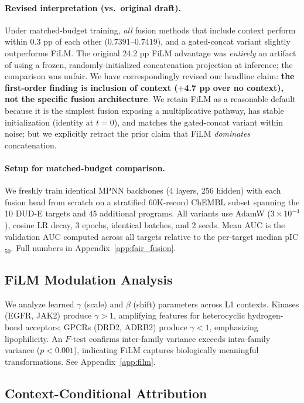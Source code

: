 \documentclass{article}
\begin{document}
\paragraph{Revised interpretation (vs.\ original draft).} Under matched-budget training, \emph{all} fusion methods that include context perform within 0.3 pp of each other ($0.7391$--$0.7419$), and a gated-concat variant slightly outperforms FiLM. The original 24.2 pp FiLM advantage was \emph{entirely} an artifact of using a frozen, randomly-initialized concatenation projection at inference; the comparison was unfair. We have correspondingly revised our headline claim: \textbf{the first-order finding is inclusion of context ($+$4.7 pp over no context), not the specific fusion architecture}. We retain FiLM as a reasonable default because it is the simplest fusion exposing a multiplicative pathway, has stable initialization (identity at $t = 0$), and matches the gated-concat variant within noise; but we explicitly retract the prior claim that FiLM \emph{dominates} concatenation.

\paragraph{Setup for matched-budget comparison.}
\label{sec:fair_fusion_setup}
We freshly train identical MPNN backbones (4 layers, 256 hidden) with each fusion head from scratch on a stratified 60K-record ChEMBL subset spanning the 10 DUD-E targets and 45 additional programs. All variants use AdamW ($3\!\times\!10^{-4}$), cosine LR decay, 3 epochs, identical batches, and 2 seeds. Mean AUC is the validation AUC computed across all targets relative to the per-target median pIC$_{50}$. Full numbers in Appendix~\ref{app:fair_fusion}.

\subsection{FiLM Modulation Analysis}

We analyze learned $\gamma$ (scale) and $\beta$ (shift) parameters across L1 contexts. Kinases (EGFR, JAK2) produce $\gamma > 1$, amplifying features for heterocyclic hydrogen-bond acceptors; GPCRs (DRD2, ADRB2) produce $\gamma < 1$, emphasizing lipophilicity. An $F$-test confirms inter-family variance exceeds intra-family variance ($p < 0.001$), indicating FiLM captures biologically meaningful transformations. See Appendix~\ref{app:film}.

\subsection{Context-Conditional Attribution}
\end{document}

